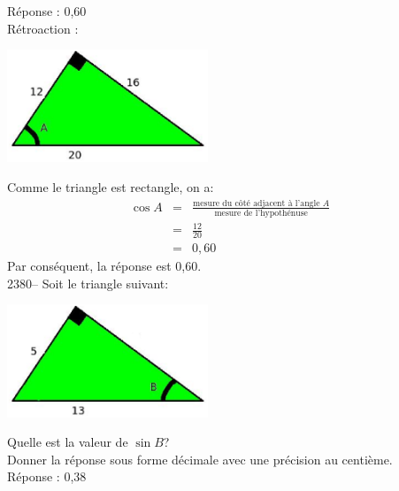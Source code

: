 \documentclass[letterpaper, 12pt]{article}
\begin{document}
R\'eponse : 0,60\\

R\'etroaction :\\
\begin{center}
 \includegraphics[width=6cm,bb=14 14 415 315]{Q2378.eps}
\end{center}
Comme le triangle est rectangle, on a:
\begin{eqnarray*}
 \cos{A}&=&\frac{\textrm{mesure du c\^ot\'e adjacent \`a l'angle $A$}}{\textrm{mesure de l'hypoth\'enuse}}\\
&=&\frac{12}{20}\\[2mm]
&=&0,60
\end{eqnarray*}
Par cons\'equent, la r\'eponse est 0,60.\\

2380-- Soit le triangle suivant:
\begin{center}
 \includegraphics[width=6cm,bb=14 14 415 315]{Q2380.eps}
\end{center}
Quelle est la valeur de $\sin{B}$?\\
Donner la r\'eponse sous forme d\'ecimale avec une pr\'ecision au centi\`eme.\\

R\'eponse : 0,38\\
\end{document}
